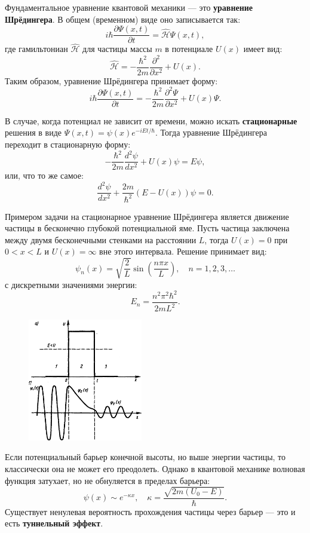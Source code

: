 Фундаментальное уравнение квантовой механики — это \textbf{уравнение Шрёдингера}. В общем (временном) виде оно записывается так:
\[
i\hbar \frac{\partial \Psi(x, t)}{\partial t} = \hat{\mathcal{H}} \Psi(x, t),
\]
где гамильтониан $\hat{\mathcal{H}}$ для частицы массы $m$ в потенциале $U(x)$ имеет вид:
\[
\hat{\mathcal{H}} = -\frac{\hbar^2}{2m} \frac{\partial^2}{\partial x^2} + U(x).
\]
Таким образом, уравнение Шрёдингера принимает форму:
\[
i\hbar \frac{\partial \Psi(x, t)}{\partial t} = -\frac{\hbar^2}{2m} \frac{\partial^2 \Psi}{\partial x^2} + U(x)\Psi.
\]

В случае, когда потенциал не зависит от времени, можно искать \textbf{стационарные} решения в виде $\Psi(x, t) = \psi(x)e^{-iEt/\hbar}$. Тогда уравнение Шрёдингера переходит в стационарную форму:
\[
-\frac{\hbar^2}{2m} \frac{d^2 \psi}{dx^2} + U(x)\psi = E\psi,
\]
или, что то же самое:
\[
\frac{d^2 \psi}{dx^2} + \frac{2m}{\hbar^2}(E - U(x))\psi = 0.
\]

Примером задачи на стационарное уравнение Шрёдингера является движение частицы в бесконечно глубокой потенциальной яме. Пусть частица заключена между двумя бесконечными стенками на расстоянии $L$, тогда $U(x) = 0$ при $0 < x < L$ и $U(x) = \infty$ вне этого интервала. Решение принимает вид:
\[
\psi_n(x) = \sqrt{\frac{2}{L}} \sin\left( \frac{n\pi x}{L} \right), \quad n = 1, 2, 3, \ldots
\]
с дискретными значениями энергии:
\[
E_n = \frac{n^2 \pi^2 \hbar^2}{2mL^2}.
\]

\begin{figure}
    \includegraphics[width=5cm]{physics2/images/physics2_2025_05_19_1}
\end{figure}

Если потенциальный барьер конечной высоты, но выше энергии частицы, то классически она не может его преодолеть. Однако в квантовой механике волновая функция затухает, но не обнуляется в пределах барьера:
\[
\psi(x) \sim e^{-\kappa x}, \quad \kappa = \frac{\sqrt{2m(U_0 - E)}}{\hbar}.
\]
Существует ненулевая вероятность прохождения частицы через барьер — это и есть \textbf{туннельный эффект}.

